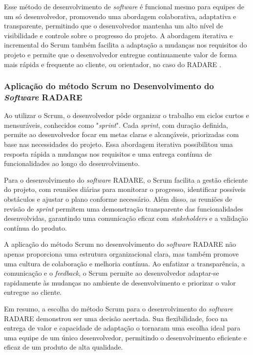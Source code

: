 Esse método de desenvolvimento de \textit{software} é funcional mesmo para equipes de um só desenvolvedor, promovendo uma abordagem colaborativa, adaptativa e transparente, permitindo que o desenvolvedor mantenha um alto nível de visibilidade e controle sobre o progresso do projeto. A abordagem iterativa e incremental do Scrum também facilita a adaptação a mudanças nos requisitos do projeto e permite que o desenvolvedor entregue continuamente valor de forma mais rápida e frequente ao cliente, ou orientador, no caso do RADARE \cite{scrum}.
        
\subsubsection{Aplicação do método Scrum no Desenvolvimento do \textit{Software} RADARE}

Ao utilizar o Scrum, o desenvolvedor pôde organizar o trabalho em ciclos curtos e mensuráveis, conhecidos como "\textit{sprint}". Cada \textit{sprint}, com duração definida, permite ao desenvolvedor focar em metas claras e alcançáveis, priorizadas com base nas necessidades do projeto. Essa abordagem iterativa possibilitou uma resposta rápida a mudanças nos requisitos e uma entrega contínua de funcionalidades ao longo do desenvolvimento.
        
Para o desenvolvimento do \textit{software} RADARE, o Scrum facilita a gestão eficiente do projeto, com reuniões diárias para monitorar o progresso, identificar possíveis obstáculos e ajustar o plano conforme necessário. Além disso, as reuniões de revisão de \textit{sprint} permitem uma demonstração transparente das funcionalidades desenvolvidas, garantindo uma comunicação eficaz com \textit{stakeholders} e a validação contínua do produto.
        
A aplicação do método Scrum no desenvolvimento do \textit{software} RADARE não apenas proporciona uma estrutura organizacional clara, mas também promove uma cultura de colaboração e melhoria contínua. Ao enfatizar a transparência, a comunicação e o \textit{feedback}, o Scrum permite ao desenvolvedor adaptar-se rapidamente às mudanças no ambiente de desenvolvimento e priorizar o valor entregue ao cliente.
        
Em resumo, a escolha do método Scrum para o desenvolvimento do \textit{software} RADARE demonstrou ser uma decisão acertada. Sua flexibilidade, foco na entrega de valor e capacidade de adaptação o tornaram uma escolha ideal para uma equipe de um único desenvolvedor, permitindo o desenvolvimento eficiente e eficaz de um produto de alta qualidade.
        
